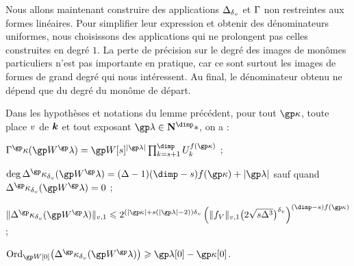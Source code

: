 Nous allons maintenant construire des applications \( \Delta_{\delta\smash{_v}} \) et \(
  \Gamma \) non restreintes aux formes linéaires. Pour simplifier leur
expression et obtenir des dénominateurs uniformes, nous choisissons des
applications qui ne prolongent pas celles construites en degré \( 1 \). La
perte de précision sur le degré des images de monômes particuliers n'est pas
importante en pratique, car ce sont surtout les images de formes de grand
degré qui nous intéressent. Au final, le dénominateur obtenu ne dépend que du
degré du monôme de départ.

\begin{lem} \label{l:par-anyvar-mono}
  Dans les hypothèses et notations du lemme précédent, pour tout \( \derp \),
  toute place \( v \) de \( {\boldsymbol k} \) et tout exposant \( \ip \in \N^\dimp*
  \), on a :
  \begin{enumthm}
    \item \( \pmden^\derp( \anyvp^\ip )
        =
        \anyvp[\anydim]^{\lgr\ip}
        \prod_{\ind = \anydim + 1}^{\dimp} \pden_\ind^{f(\derp)}
      \) ;
    \item \( \deg \pmnum^\derp_\dv (\anyvp^\ip)
        = (\anydeg - 1) (\dimp - \anydim) f(\derp) + \lgr\ip \) sauf quand
      \( \pmnum^\derp_\dv (\anyvp^\ip) = 0 \) ;
    \item \(
        \nv1{ \pmnum^\derp_\dv (\anyvp^\ip) }
        \le
        2^{ (\lgr\derp + \anydim (\lgr\ip - 2))\dv }
        \left(
          \nv1{ \chow\anyvar }
          \bigl( 2 \sqrt{\anydim \anydeg^{3}} \bigr)^\dv
        \right)^{(\dimp - \anydim) f(\derp)}
      \) ;
    \item \( \ord_{\anyvp[0]} \bigl( \pmnum^\derp_\dv (\anyvp^\ip) \bigr)
        \ge \ip[0] - \derp[0] \).
  \end{enumthm}
\end{lem}

